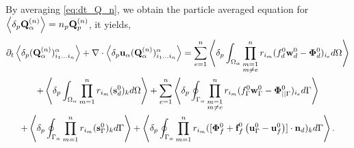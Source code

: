 
By averaging \ref{eq:dt_Q_n}, we obtain the particle averaged equation for $\left<\delta_p \textbf{Q}_\alpha^{(n)}\right> = n_p\textbf{Q}_p^{(n)} $, it yields,
\begin{multline}
    \partial_t \left<\delta_p (\textbf{Q}_\alpha^{(n)})_{i_1\ldots i_n}^\alpha\right>
    + \mathbf{\nabla}\cdot  \left<\delta_p \textbf{u}_\alpha (\textbf{Q}_\alpha^{(n)})_{i_1\ldots i_n}^\alpha\right>
    = \sum_{e=1}^{n} 
    \left<\delta_p \int_{\Omega_{\alpha}} 
        \prod^{n}_{\substack{ m=1 \\m \neq e}} r_{i_m} (f_d^0\textbf{w}_d^0  - \bm\Phi_d^0)_{i_e}
     d\Omega\right>\\
    + \left<\delta_p \int_{\Omega_{\alpha}}  \prod_{m=1}^{n} r_{i_m} (\textbf{s}_d^0)_k  d\Omega\right>
    +     
    \sum_{e=1}^{n} 
    \left<\delta_p \oint_{\Gamma_{\alpha}} 
        \prod^{n}_{\substack{ m=1 \\m \neq e}} r_{i_m} (f_\Gamma^0\textbf{w}_\Gamma^0 - \bm\Phi_{||\Gamma}^0)_{i_e}
     d\Gamma\right>\\
    + \left<\delta_p \oint_{\Gamma_{\alpha}}  \prod_{m=1}^{n} r_{i_m} (\textbf{s}_\Gamma^0)_k  d\Gamma\right>
    +\left<\delta_p \oint_{\Gamma_{\alpha}}  \prod_{m=1}^{n} r_{i_m} ([\bm\Phi_f^0 + \textbf{f}_f^0 \left(\textbf{u}_\Gamma^0 - \textbf{u}_f^0\right)]\cdot \textbf{n}_d)_k  d\Gamma\right>. 
\end{multline}

